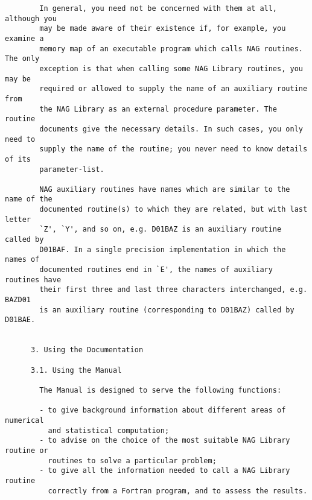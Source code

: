 \begin{small}
\begin{verbatim}
        In general, you need not be concerned with them at all, although you      
        may be made aware of their existence if, for example, you examine a       
        memory map of an executable program which calls NAG routines. The only    
        exception is that when calling some NAG Library routines, you may be      
        required or allowed to supply the name of an auxiliary routine from       
        the NAG Library as an external procedure parameter. The routine           
        documents give the necessary details. In such cases, you only need to     
        supply the name of the routine; you never need to know details of its     
        parameter-list.                                                           
                                                                                  
        NAG auxiliary routines have names which are similar to the name of the    
        documented routine(s) to which they are related, but with last letter     
        `Z', `Y', and so on, e.g. D01BAZ is an auxiliary routine called by        
        D01BAF. In a single precision implementation in which the names of        
        documented routines end in `E', the names of auxiliary routines have      
        their first three and last three characters interchanged, e.g. BAZD01     
        is an auxiliary routine (corresponding to D01BAZ) called by D01BAE.       
                                                                                  
                                                                                  
      3. Using the Documentation                                                  
                                                                                  
      3.1. Using the Manual                                                       
                                                                                  
        The Manual is designed to serve the following functions:                  
                                                                                  
        - to give background information about different areas of numerical       
          and statistical computation;                                            
        - to advise on the choice of the most suitable NAG Library routine or     
          routines to solve a particular problem;                                 
        - to give all the information needed to call a NAG Library routine        
          correctly from a Fortran program, and to assess the results.            
                                                                                  

\end{verbatim}
\end{small}

